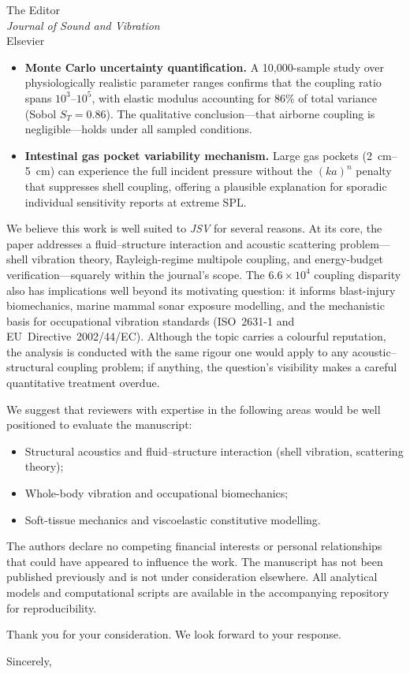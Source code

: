 \documentclass[11pt]{letter}
\begin{document}
\begin{letter}{%
  The Editor\\
  \textit{Journal of Sound and Vibration}\\
  Elsevier}
\begin{itemize}
  \item \textbf{Monte Carlo uncertainty quantification.}  A 10{,}000-sample
    study over physiologically realistic parameter ranges confirms
    that the coupling ratio spans $10^3$--$10^5$, with elastic modulus
    accounting for 86\% of total variance (Sobol $S_T = 0.86$).  The
    qualitative conclusion---that airborne coupling is negligible---holds
    under all sampled conditions.

  \item \textbf{Intestinal gas pocket variability mechanism.}  Large gas
    pockets (\SIrange{2}{5}{\centi\metre}) can experience the full incident
    pressure without the $(ka)^n$ penalty that suppresses shell coupling,
    offering a plausible explanation for sporadic individual sensitivity
    reports at extreme SPL.
\end{itemize}

We believe this work is well suited to \textit{JSV} for several reasons.
At its core, the paper addresses a fluid--structure interaction and
acoustic scattering problem---shell vibration theory, Rayleigh-regime
multipole coupling, and energy-budget verification---squarely within the
journal's scope.  The $6.6 \times 10^4$ coupling disparity also has
implications well beyond its motivating question: it informs blast-injury
biomechanics, marine mammal sonar exposure modelling, and the mechanistic
basis for occupational vibration standards (ISO~2631-1 and
EU~Directive~2002/44/EC).  Although the topic carries a colourful reputation,
the analysis is conducted with the same rigour one would apply to any
acoustic--structural coupling problem; if anything, the question's visibility
makes a careful quantitative treatment overdue.

We suggest that reviewers with expertise in the following areas would be
well positioned to evaluate the manuscript:
%
\begin{itemize}
  \item Structural acoustics and fluid--structure interaction (shell
    vibration, scattering theory);
  \item Whole-body vibration and occupational biomechanics;
  \item Soft-tissue mechanics and viscoelastic constitutive modelling.
\end{itemize}

The authors declare no competing financial interests or personal
relationships that could have appeared to influence the work.  The manuscript
has not been published previously and is not under consideration elsewhere.
All analytical models and computational scripts are available in the
accompanying repository for reproducibility.

Thank you for your consideration.  We look forward to your response.

\closing{Sincerely,}

\end{letter}
\end{document}
